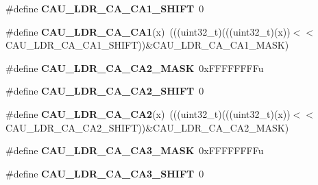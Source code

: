\begin{DoxyCompactItemize}
\item 
\#define {\bfseries C\+A\+U\+\_\+\+L\+D\+R\+\_\+\+C\+A\+\_\+\+C\+A1\+\_\+\+S\+H\+I\+FT}~0\hypertarget{group__CAU__Register__Masks_ga7c6e3a6f8d94f1b39d9f6334d6916b64}{}\label{group__CAU__Register__Masks_ga7c6e3a6f8d94f1b39d9f6334d6916b64}

\item 
\#define {\bfseries C\+A\+U\+\_\+\+L\+D\+R\+\_\+\+C\+A\+\_\+\+C\+A1}(x)~(((uint32\+\_\+t)(((uint32\+\_\+t)(x))$<$$<$C\+A\+U\+\_\+\+L\+D\+R\+\_\+\+C\+A\+\_\+\+C\+A1\+\_\+\+S\+H\+I\+FT))\&C\+A\+U\+\_\+\+L\+D\+R\+\_\+\+C\+A\+\_\+\+C\+A1\+\_\+\+M\+A\+SK)\hypertarget{group__CAU__Register__Masks_ga17d3eb3ab5c88211cb8c4a41d749b346}{}\label{group__CAU__Register__Masks_ga17d3eb3ab5c88211cb8c4a41d749b346}

\item 
\#define {\bfseries C\+A\+U\+\_\+\+L\+D\+R\+\_\+\+C\+A\+\_\+\+C\+A2\+\_\+\+M\+A\+SK}~0x\+F\+F\+F\+F\+F\+F\+F\+Fu\hypertarget{group__CAU__Register__Masks_gada0be8752ff081d41bd530392613175b}{}\label{group__CAU__Register__Masks_gada0be8752ff081d41bd530392613175b}

\item 
\#define {\bfseries C\+A\+U\+\_\+\+L\+D\+R\+\_\+\+C\+A\+\_\+\+C\+A2\+\_\+\+S\+H\+I\+FT}~0\hypertarget{group__CAU__Register__Masks_gaf922a639148e6bfa357029f20b0d1aef}{}\label{group__CAU__Register__Masks_gaf922a639148e6bfa357029f20b0d1aef}

\item 
\#define {\bfseries C\+A\+U\+\_\+\+L\+D\+R\+\_\+\+C\+A\+\_\+\+C\+A2}(x)~(((uint32\+\_\+t)(((uint32\+\_\+t)(x))$<$$<$C\+A\+U\+\_\+\+L\+D\+R\+\_\+\+C\+A\+\_\+\+C\+A2\+\_\+\+S\+H\+I\+FT))\&C\+A\+U\+\_\+\+L\+D\+R\+\_\+\+C\+A\+\_\+\+C\+A2\+\_\+\+M\+A\+SK)\hypertarget{group__CAU__Register__Masks_ga21841b16ab149bb4c2d3d96657e064e1}{}\label{group__CAU__Register__Masks_ga21841b16ab149bb4c2d3d96657e064e1}

\item 
\#define {\bfseries C\+A\+U\+\_\+\+L\+D\+R\+\_\+\+C\+A\+\_\+\+C\+A3\+\_\+\+M\+A\+SK}~0x\+F\+F\+F\+F\+F\+F\+F\+Fu\hypertarget{group__CAU__Register__Masks_gadc483f48a51a7e423bd122f4175d4dd8}{}\label{group__CAU__Register__Masks_gadc483f48a51a7e423bd122f4175d4dd8}

\item 
\#define {\bfseries C\+A\+U\+\_\+\+L\+D\+R\+\_\+\+C\+A\+\_\+\+C\+A3\+\_\+\+S\+H\+I\+FT}~0\hypertarget{group__CAU__Register__Masks_ga31b5ff2083be706bf9f333d80d4992fc}{}\label{group__CAU__Register__Masks_ga31b5ff2083be706bf9f333d80d4992fc}


\end{DoxyCompactItemize}
